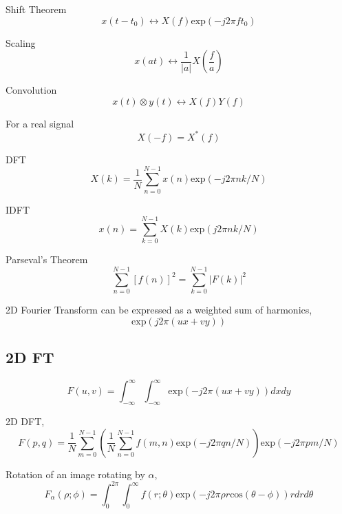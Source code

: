 \documentclass[12pt]{article}
\begin{document}
Shift Theorem
\begin{equation}
    x(t-t_0) \leftrightarrow X(f)\textrm{exp}(-j2\pi ft_0)
\end{equation}

Scaling
\begin{equation}
    x(at) \leftrightarrow \frac{1}{ |a| } X \left(\frac{f}{a}\right)
\end{equation}

Convolution
\begin{equation}
    x(t) \otimes y(t) \leftrightarrow X(f)Y(f)
\end{equation}

For a real signal
\begin{equation}
    X(-f) = X^*(f)
\end{equation}

DFT
\begin{equation}
    X(k) = \frac{1}{N} \sum_{n=0}^{N-1} x(n) \textrm{exp}(-j2\pi nk / N)
\end{equation}

IDFT
\begin{equation}
    x(n) = \sum_{k=0}^{N-1} X(k) \textrm{exp} (j2\pi nk/N)
\end{equation}

Parseval's Theorem
\begin{equation}
    \sum_{n=0}^{N-1} [f(n)]^2 = \sum_{k=0}^{N-1}|F(k)|^2
\end{equation}

2D Fourier Transform can be expressed as a weighted sum of harmonics,
\begin{equation}
    \textrm{exp}(j2\pi (ux+vy))
\end{equation}

\subsection{2D FT}

\begin{equation}
    F(u,v) = \int_{-\infty}^{\infty} \int_{-\infty}^{\infty} \textrm{exp} (-j2\pi (ux+vy))dx dy
\end{equation}

2D DFT,
\begin{equation}
    F(p,q) = \frac{1}{N} \sum_{m=0}^{N-1} \left(\frac{1}{N} \sum_{n=0}^{N-1} f(m,n) \textrm{exp} (-j2\pi qn/N)\textrm{}\right) \textrm{exp} (-j2\pi pm / N)
\end{equation}

Rotation of an image rotating by $\alpha$,
\begin{equation}
    F_\alpha (\rho;\phi) = \int_0^{2\pi} \int_0^{\infty} f(r;\theta) \textrm{exp} (-j2\pi\rho r \textrm{cos}(\theta-\phi))r drd\theta
\end{equation}
\end{document}
